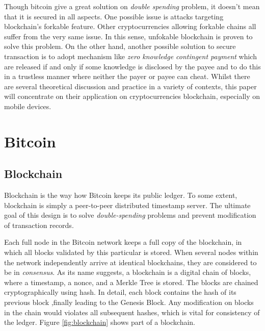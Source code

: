 \documentclass[12pt]{article}
\begin{document}
Though bitcoin give a great solution on \textit{double spending} problem, it doesn't mean that it is secured in all aspects. One possible issue is attacks targeting blockchain's forkable feature. Other cryptocurrencies allowing forkable chains all suffer from the very same issue. In this sense, unfokable blockchain is proven to solve this problem. On the other hand, another possible solution to secure transaction is to adopt mechanism like \textit{zero knowledge contingent payment} which are released if and only if some knowledge is disclosed by the payee and to do this in a trustless manner where neither the payer or payee can cheat. Whilst there are several theoretical discussion and practice in a variety of contexts, this paper will concentrate on their application on cryptocurrencies blockchain, especially on mobile devices. 

\section{Bitcoin}
\label{sec:Blockchain}

\subsection{Blockchain}

Blockchain is the way how Bitcoin keeps its public ledger. To some extent, blockchain is simply a peer-to-peer distributed timestamp server. The ultimate goal of this design is to solve \textit{double-spending} problems and prevent modification of transaction records. 

Each full node in the Bitcoin network keeps a full copy of the blockchain, in which all blocks validated by this particular is stored. When several nodes within the network independently arrive at identical blockchains, they are considered to be in \textit{consensus}. As its name suggests, a blockchain is a digital chain of blocks, where a timestamp, a nonce, and a Merkle Tree is stored.  The blocks are chained cryptographically using hash. In detail, each block contains the hash of its previous block ,finally leading to the Genesis Block. Any modification on blocks in the chain would violates all subsequent hashes, which is vital for consistency of the ledger. Figure \ref{fig:blockchain} shows part of a blockchain. 
\end{document}
